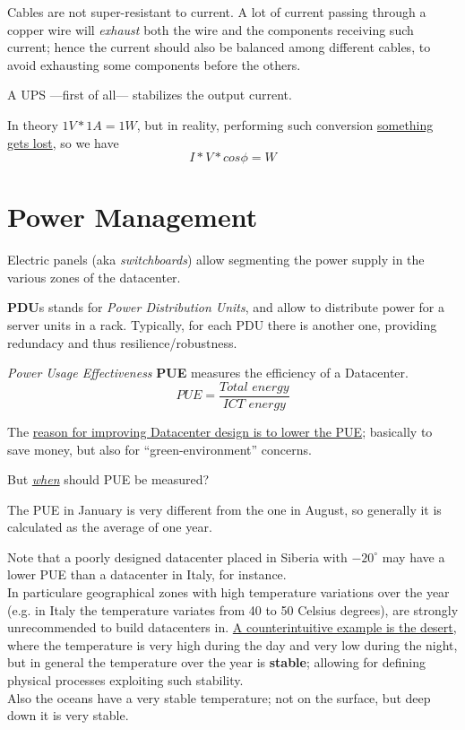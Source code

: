 Cables are not super-resistant to current. A lot of current passing through a copper wire will \textit{exhaust} both the wire and the components receiving such current;
hence the current should also be balanced among different cables, to avoid exhausting some components before the others.


A UPS ---first of all--- stabilizes the output current.

In theory $1V * 1A = 1W$, but in reality, performing such conversion \ul{something gets lost}, so we have
\[I * V * cos \phi = W\]

\section{Power Management}

Electric panels (aka \textit{switchboards}) allow segmenting the power supply in the various zones of the datacenter.

\textbf{PDU}s stands for \textit{Power Distribution Units}, and allow to distribute power for a server units in a rack.
Typically, for each PDU there is another one, providing redundacy and thus resilience/robustness.

\nl

\begin{definition}[PUE]
\textit{Power Usage Effectiveness} \textbf{PUE} measures the efficiency of a Datacenter.
\[PUE = \frac{
   \textit{Total energy}
}{\textit{ICT energy}}\]
\end{definition}
The \ul{reason for improving Datacenter design is to lower the PUE};
basically to save money, but also for ``green-environment'' concerns.

\begin{center}
   But \textit{\ul{when}} should PUE be measured?
\end{center}
The PUE in January is very different from the one in August, so generally it is calculated as the average of one year.

Note that a poorly designed datacenter placed in Siberia with $-20^{\circ}$ may have a lower PUE than a datacenter in Italy, for instance.\\
In particulare geographical zones with high temperature variations over the year (e.g. in Italy the temperature variates from 40 to 50 Celsius degrees), are strongly unrecommended to build datacenters in.
\ul{A counterintuitive example is the desert}, where the temperature is very high during the day and very low during the night, but in general the temperature over the year is \textbf{stable}; allowing for defining physical processes exploiting such stability.\\
Also the oceans have a very stable temperature; not on the surface, but deep down it is very stable.

